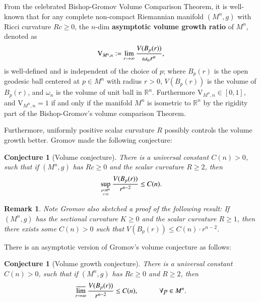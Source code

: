 \documentclass[11pt]{amsart}
\newtheorem{remark}[theorem]{Remark}
\newtheorem{conj}[theorem]{Conjecture}
\numberwithin{equation}{section}
\begin{document}
From the celebrated Bishop-Gromov Volume Comparison Theorem,  it is well-known that for any complete non-compact Riemannian manifold $(M^n, g)$ with Ricci curvature $Rc\geq 0$, the $n$-dim \textbf{asymptotic volume growth ratio} of $M^n$, denoted as\begin{align}
\mathrm{V}_{M^n, n}\vcentcolon= \lim_{r\rightarrow\infty}\frac{V(B_p(r))}{\omega_n r^n}, \nonumber 
\end{align}
is well-defined and is independent of the choice of $p$; where $B_p(r)$ is the open geodesic ball centered at $p\in M^n$ with radius $r> 0$,  $V(B_p(r))$ is the volume of $B_p(r)$,  and $\omega_n$ is the volume of unit ball in $\mathbb{R}^n$. Furthermore $\mathrm{V}_{M^n, n}\in [0, 1]$, and $\mathrm{V}_{M^n, n}= 1$ if and only if the manifold $M^n$ is isometric to $\mathbb{R}^n$ by the rigidity part of the Bishop-Gromov's volume comparison Theorem.

Furthermore,  uniformly positive scalar curvature $R$ possibly controls the volume growth better.  Gromov \cite[(5')]{Gromov-large-mflds}  made the following conjecture:
\begin{conj}[Volume conjecture]
{There is a universal constant $C(n)> 0$,  such that if $(M^n,  g)$ has $Rc\geq 0$ and the scalar curvature $R\geq 2$, then 
\begin{align}
\sup_{p\in M^n\atop r> 0} \frac{V(B_p(r))}{r^{n- 2}}\leq C(n).  \nonumber 
\end{align}
}
\end{conj}

\begin{remark}\label{rem sectional curv is non-nega}
{Note Gromov \cite[2.B.]{Gromov-large-mflds} also sketched a proof of the following result: If $(M^n, g)$ has the sectional curvature $K\geq 0$ and the scalar curvature $R\geq 1$,  then there exists some $C(n)> 0$ such that $\displaystyle V(B_p(r))\leq C(n)\cdot r^{n- 2}$.  
}
\end{remark}

There is an asymptotic version of Gromov's volume conjecture as follows:
\begin{conj}[Volume growth conjecture]\label{conj volume growth of Gromov}
{There is a universal constant $C(n)> 0$,  such that if $(M^n,  g)$ has $Rc\geq 0$ and $R\geq 2$, then 
\begin{align}
\varlimsup_{r\rightarrow \infty} \frac{V(B_p(r))}{r^{n- 2}}\leq C(n), \quad \quad \quad \forall p\in M^n. \nonumber 
\end{align}
}
\end{conj}
\end{document}
